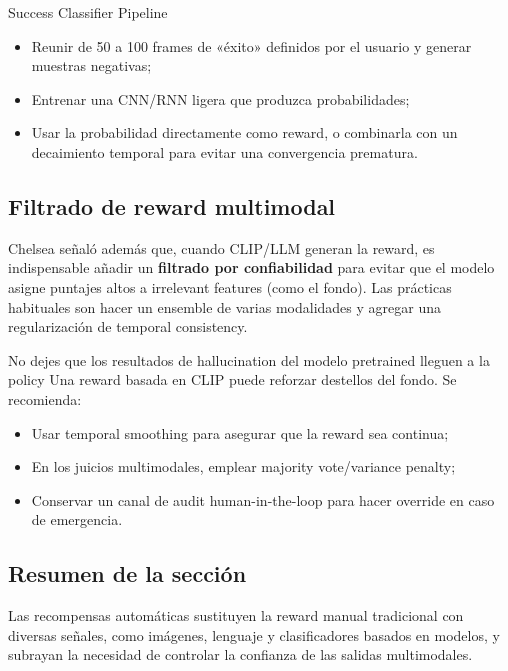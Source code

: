 \begin{knowledgebox}{Success Classifier Pipeline}
\begin{itemize}
\item Reunir de 50 a 100 frames de «éxito» definidos por el usuario y generar muestras negativas;\\
\item Entrenar una CNN/RNN ligera que produzca probabilidades;\\
\item Usar la probabilidad directamente como reward, o combinarla con un decaimiento temporal para evitar una convergencia prematura.
\end{itemize}
\end{knowledgebox}

\subsection{Filtrado de reward multimodal}
Chelsea señaló además que, cuando CLIP/LLM generan la reward, es indispensable añadir un \textbf{filtrado por confiabilidad} para evitar que el modelo asigne puntajes altos a irrelevant features (como el fondo). Las prácticas habituales son hacer un ensemble de varias modalidades y agregar una regularización de temporal consistency.

\begin{warningbox}{No dejes que los resultados de hallucination del modelo pretrained lleguen a la policy}
Una reward basada en CLIP puede reforzar destellos del fondo. Se recomienda:
\begin{itemize}
\item Usar temporal smoothing para asegurar que la reward sea continua;\\
\item En los juicios multimodales, emplear majority vote/variance penalty;\\
\item Conservar un canal de audit human-in-the-loop para hacer override en caso de emergencia.
\end{itemize}
\end{warningbox}

\subsection{Resumen de la sección}
Las recompensas automáticas sustituyen la reward manual tradicional con diversas señales, como imágenes, lenguaje y clasificadores basados en modelos, y subrayan la necesidad de controlar la confianza de las salidas multimodales.
\newpage
